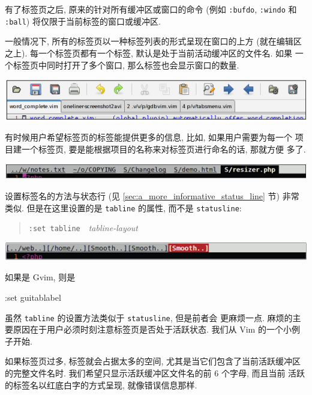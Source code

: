 有了标签页之后, 原来的针对所有缓冲区或窗口的命令 (例如 \texttt{:bufdo},
\texttt{:windo} 和 \texttt{:ball}) 将仅限于当前标签的窗口或缓冲区.

一般情况下, 所有的标签页以一种标签列表的形式呈现在窗口的上方 (就在编辑区
之上). 每一个标签页都有一个标签, 默认是处于当前活动缓冲区的文件名. 如果 
一个标签页中同时打开了多个窗口, 那么标签也会显示窗口的数量.
\begin{center}
\includegraphics[scale=0.48]{./images/page33.png}
\end{center}
有时候用户希望标签页的标签能提供更多的信息, 比如, 如果用户需要为每一个
项目建一个标签页, 要是能根据项目的名称来对标签页进行命名的话, 那就方便
多了.
\begin{center}
\includegraphics[scale=0.48]{./images/page34-1.png}
\end{center}
设置标签名的方法与状态行 (见 \ref{sec:a_more_informative_status_line} 节)
非常类似. 但是在这里设置的是 \texttt{tabline} 的属性, 而不是
\texttt{statusline}:
\begin{quotation}
\texttt{:set tabline}\ \ \textit{tabline-layout}
\end{quotation}
\begin{center}
\includegraphics[scale=0.48]{./images/page34-2.png}
\end{center}
如果是 Gvim, 则是
\begin{vimcmd}
:set guitablabel
\end{vimcmd}

虽然 \texttt{tabline} 的设置方法类似于 \texttt{statusline}, 但是前者会
更麻烦一点. 麻烦的主要原因在于用户必须时刻注意标签页是否处于活跃状态.
我们从 Vim 的一个小例子开始.

如果标签页过多, 标签就会占据太多的空间, 尤其是当它们包含了当前活跃缓冲区
的完整文件名时. 我们希望只显示活跃缓冲区文件名的前 6 个字母, 而且当前
活跃的标签名以红底白字的方式呈现, 就像错误信息那样.

